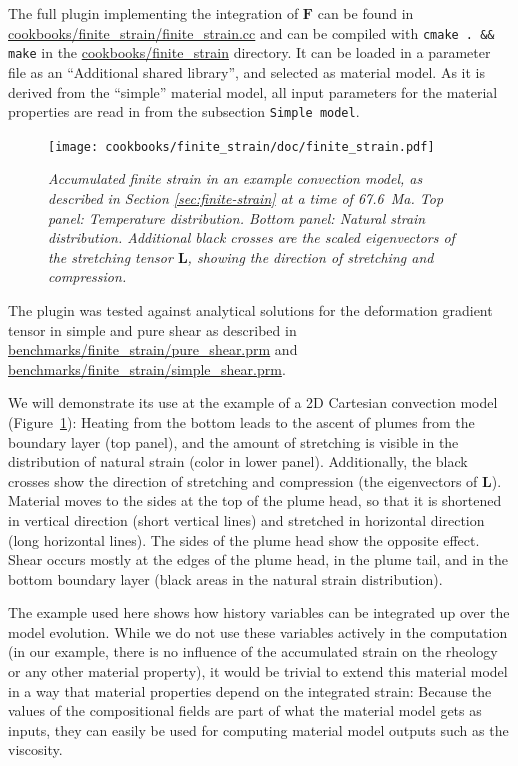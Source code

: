 \documentclass{article}
\begin{document}
The full plugin implementing the integration of $\mathbf F$ can be found in \url{cookbooks/finite_strain/finite_strain.cc} and can be compiled
with \texttt{cmake . \&\& make} in the \url{cookbooks/finite_strain} directory.
It can be loaded in a parameter file as an ``Additional shared library'', and selected as material
model. As it is derived from the ``simple'' material model, all input parameters for the material
properties are read in from the subsection \texttt{Simple model}.


\begin{figure}
    \centering
    \texttt{[image: cookbooks/finite\_strain/doc/finite\_strain.pdf]}
    \caption{\it Accumulated finite strain in an example convection model, as described in Section
             \ref{sec:finite-strain} at a time of 67.6~Ma. Top panel: Temperature distribution. Bottom panel:
             Natural strain distribution. Additional black crosses are the scaled eigenvectors of the
             stretching tensor $\mathbf L$, showing the direction of stretching and compression.}
    \label{fig:finite_strain}
\end{figure}

The plugin was tested against analytical solutions for the deformation gradient tensor in simple and pure shear as described in \url{benchmarks/finite_strain/pure_shear.prm} and \url{benchmarks/finite_strain/simple_shear.prm}.

We will demonstrate its use at the example of a 2D Cartesian convection model (Figure~\ref{fig:finite_strain}):
Heating from the bottom leads to the ascent of plumes from the boundary layer (top panel), and the
amount of stretching is visible in the distribution of natural strain (color in lower panel).
Additionally, the black crosses show the direction of stretching and compression (the eigenvectors of $\mathbf L$).
Material moves to the sides at the top of the plume head, so that it is shortened in vertical
direction (short vertical lines) and stretched in horizontal direction (long horizontal lines).
The sides of the plume head show the opposite effect. Shear occurs mostly at the
edges of the plume head, in the plume tail, and in the bottom boundary layer
(black areas in the natural strain distribution).

The example used here shows how history variables can be integrated up over the model evolution.
While we do not use these variables actively in the computation (in our example, there is no
influence of the accumulated strain on the rheology or any other material property), it would be trivial
to extend this material model in a way that material properties depend on the integrated strain:
Because the values of the compositional fields are part of what the material model gets as inputs,
they can easily be used for computing material model outputs such as the viscosity.
\end{document}
